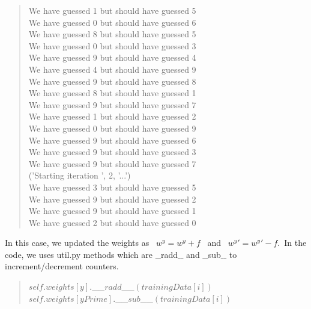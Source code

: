 \documentclass{article}
\begin{document}
\begin{quote}
        We have guessed 1 but should have guessed 5\\
        We have guessed 0 but should have guessed 6\\
        We have guessed 8 but should have guessed 5\\
        We have guessed 0 but should have guessed 3\\
        We have guessed 9 but should have guessed 4\\
        We have guessed 4 but should have guessed 9\\
        We have guessed 9 but should have guessed 8\\
        We have guessed 8 but should have guessed 1\\
        We have guessed 9 but should have guessed 7\\
        We have guessed 1 but should have guessed 2\\
        We have guessed 0 but should have guessed 9\\
        We have guessed 9 but should have guessed 6\\
        We have guessed 9 but should have guessed 3\\
        We have guessed 9 but should have guessed 7\\
        ('Starting iteration ', 2, '...')\\
        We have guessed 3 but should have guessed 5\\
        We have guessed 9 but should have guessed 2\\
        We have guessed 9 but should have guessed 1\\
        We have guessed 2 but should have guessed 0\\
        \end{quote}
            

        
        In this case, we updated the weights as \ $w^y = w^y + f$ \ and \ $w^y' = w^y' - f$.\ In the code, we uses util.py methods which are $\_\_$radd$\_\_$ and $\_\_$sub$\_\_$ to increment/decrement counters.
        \begin{quote}
            $self.weights[y].$\_\_$radd$\_\_$(trainingData[i])$\\
            $self.weights[yPrime].$\_\_$sub$\_\_$(trainingData[i])$
        \end{quote}
            
\end{document}
